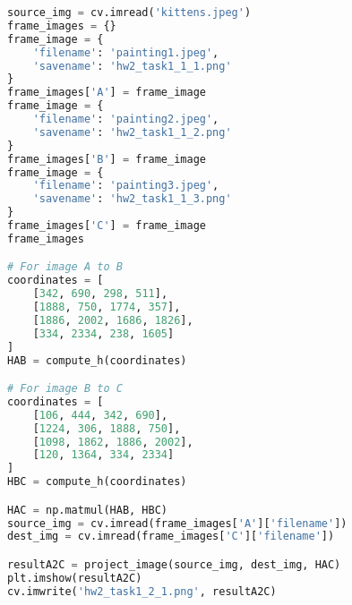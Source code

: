 \documentclass[11pt]{article}
\begin{document}
\begin{lstlisting}[language=Python, showstringspaces=false]
source_img = cv.imread('kittens.jpeg')
frame_images = {}
frame_image = {
    'filename': 'painting1.jpeg',
    'savename': 'hw2_task1_1_1.png'
}
frame_images['A'] = frame_image
frame_image = {
    'filename': 'painting2.jpeg',
    'savename': 'hw2_task1_1_2.png'
}
frame_images['B'] = frame_image
frame_image = {
    'filename': 'painting3.jpeg',
    'savename': 'hw2_task1_1_3.png'
}
frame_images['C'] = frame_image
frame_images

# For image A to B 
coordinates = [
    [342, 690, 298, 511],
    [1888, 750, 1774, 357],
    [1886, 2002, 1686, 1826],
    [334, 2334, 238, 1605]
]
HAB = compute_h(coordinates)

# For image B to C
coordinates = [
    [106, 444, 342, 690],
    [1224, 306, 1888, 750],
    [1098, 1862, 1886, 2002],
    [120, 1364, 334, 2334]
]
HBC = compute_h(coordinates)

HAC = np.matmul(HAB, HBC)
source_img = cv.imread(frame_images['A']['filename'])
dest_img = cv.imread(frame_images['C']['filename'])

resultA2C = project_image(source_img, dest_img, HAC)
plt.imshow(resultA2C)
cv.imwrite('hw2_task1_2_1.png', resultA2C)

\end{lstlisting}
\end{document}
